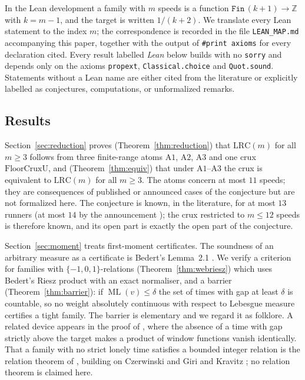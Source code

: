 \documentclass[11pt]{amsart}
\theoremstyle{plain}
\theoremstyle{definition}
\theoremstyle{remark}
\newcommand{\ML}{\operatorname{ML}}
\newcommand{\Z}{\mathbb{Z}}
\newcommand{\LRC}{\mathrm{LRC}}
\begin{document}
In the Lean development a family with $m$ speeds is a function $\mathtt{Fin}\,(k+1)\to\Z$ with
$k=m-1$, and the target is written $1/(k+2)$. We translate every Lean statement to the index $m$;
the correspondence is recorded in the file \texttt{LEAN\_MAP.md} accompanying this paper, together
with the output of \verb|#print axioms| for every declaration cited. Every result labelled
\emph{Lean} below builds with no \texttt{sorry} and depends only on the axioms \texttt{propext},
\texttt{Classical.choice} and \texttt{Quot.sound}. Statements without a Lean name are either cited
from the literature or explicitly labelled as conjectures, computations, or unformalized remarks.

\subsection{Results}
Section~\ref{sec:reduction} proves (Theorem~\ref{thm:reduction}) that $\LRC(m)$ for all $m\ge3$
follows from three finite-range atoms $\mathrm{A1}$, $\mathrm{A2}$, $\mathrm{A3}$ and one crux
$\mathrm{FloorCruxU}$, and (Theorem~\ref{thm:equiv}) that under $\mathrm{A1}$--$\mathrm{A3}$ the
crux is equivalent to $\LRC(m)$ for all $m\ge 3$. The atoms concern at most $11$ speeds; they are
consequences of published or announced cases of the conjecture \cite{cp,bhk,bs,ros8,ros9,trak,st}
but are not formalized here. The conjecture is known, in the literature, for at most $13$ runners
\cite{st} (at most $14$ by the announcement \cite{allikvere}); the crux restricted to $m\le 12$
speeds is therefore known, and its open part is exactly the open part of the conjecture.

Section~\ref{sec:moment} treats first-moment certificates. The soundness of an arbitrary measure
as a certificate is Bedert's Lemma~2.1 \cite{bedert}. We verify a criterion for families with
$\{-1,0,1\}$-relations (Theorem~\ref{thm:webriesz}) which uses Bedert's Riesz product with an exact
normaliser, and a barrier (Theorem~\ref{thm:barrier}): if $\ML(v)\le\delta$ the set of times with
gap at least $\delta$ is countable, so no weight absolutely continuous with respect to Lebesgue
measure certifies a tight family. The barrier is elementary and we regard it as folklore. A related device appears in the proof
of \cite[Thm.~2.1]{beckeverett}, where the absence of a time with gap strictly above the target
makes a product of window functions vanish identically. That a family with no strict lonely time satisfies a bounded integer relation is the relation theorem of \cite{beckeverett}, building on Czerwinski \cite{czerwinski} and Giri and Kravitz \cite{gk}; no relation theorem is claimed here.
\end{document}
